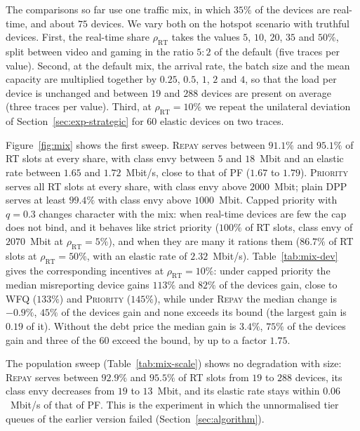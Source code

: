 \documentclass[preprint,11pt]{elsarticle}
\theoremstyle{definition}
\theoremstyle{remark}
\newcommand{\repay}{\textsc{Repay}}
\begin{document}
The comparisons so far use one traffic mix, in which $35\%$ of the devices are real-time, and about $75$ devices.
We vary both on the hotspot scenario with truthful devices.
First, the real-time share $\rho_{\mathrm{RT}}$ takes the values $5$, $10$, $20$, $35$ and $50\%$, split between video and gaming in the ratio $5:2$ of the default (five traces per value).
Second, at the default mix, the arrival rate, the batch size and the mean capacity are multiplied together by $0.25$, $0.5$, $1$, $2$ and $4$, so that the load per device is unchanged and between $19$ and $288$ devices are present on average (three traces per value).
Third, at $\rho_{\mathrm{RT}}=10\%$ we repeat the unilateral deviation of Section~\ref{sec:exp-strategic} for $60$ elastic devices on two traces.

Figure~\ref{fig:mix} shows the first sweep.
\repay{} serves between $91.1\%$ and $95.1\%$ of RT slots at every share, with class envy between $5$ and $18$~Mbit and an elastic rate between $1.65$ and $1.72$~Mbit/s, close to that of \textsc{PF} ($1.67$ to $1.79$).
\textsc{Priority} serves all RT slots at every share, with class envy above $2000$~Mbit; plain DPP serves at least $99.4\%$ with class envy above $1000$~Mbit.
Capped priority with $q=0.3$ changes character with the mix: when real-time devices are few the cap does not bind, and it behaves like strict priority ($100\%$ of RT slots, class envy of $2070$~Mbit at $\rho_{\mathrm{RT}}=5\%$), and when they are many it rations them ($86.7\%$ of RT slots at $\rho_{\mathrm{RT}}=50\%$, with an elastic rate of $2.32$~Mbit/s).
Table~\ref{tab:mix-dev} gives the corresponding incentives at $\rho_{\mathrm{RT}}=10\%$: under capped priority the median misreporting device gains $113\%$ and $82\%$ of the devices gain, close to \textsc{WFQ} ($133\%$) and \textsc{Priority} ($145\%$), while under \repay{} the median change is $-0.9\%$, $45\%$ of the devices gain and none exceeds its bound (the largest gain is $0.19$ of it).
Without the debt price the median gain is $3.4\%$, $75\%$ of the devices gain and three of the $60$ exceed the bound, by up to a factor $1.75$.

The population sweep (Table~\ref{tab:mix-scale}) shows no degradation with size: \repay{} serves between $92.9\%$ and $95.5\%$ of RT slots from $19$ to $288$ devices, its class envy decreases from $19$ to $13$~Mbit, and its elastic rate stays within $0.06$~Mbit/s of that of \textsc{PF}.
This is the experiment in which the unnormalised tier queues of the earlier version failed (Section~\ref{sec:algorithm}).
\end{document}

